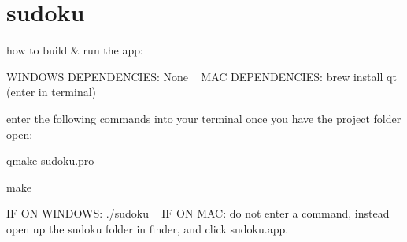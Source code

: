 \chapter{sudoku}
\hypertarget{md__r_e_a_d_m_e}{}\label{md__r_e_a_d_m_e}
\label{md__r_e_a_d_m_e_autotoc_md0}%
%
 how to build \& run the app\+:

WINDOWS DEPENDENCIES\+: None ~\newline
 MAC DEPENDENCIES\+: brew install qt (enter in terminal)

enter the following commands into your terminal once you have the project folder open\+:


\begin{DoxyEnumerate}
\item qmake sudoku.\+pro
\item make
\item IF ON WINDOWS\+: ./sudoku ~\newline
 IF ON MAC\+: do not enter a command, instead open up the sudoku folder in finder, and click \textquotesingle{}sudoku.\+app\textquotesingle{}. 
\end{DoxyEnumerate}
